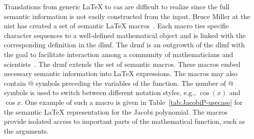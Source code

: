 \documentclass[a4paper,11pt]{article}
\theoremstyle{defTheoStyle}
\theoremstyle{defExampStyle}
\begin{document}
	Translations from generic \LaTeX{} to \gls*{cas} are difficult to realize since the full semantic information is not easily constructed from the input. Bruce Miller at the \gls*{nist} has created a set of semantic \LaTeX{} macros~\parencite{DLMF:Macros}. Each macro ties specific character sequences to a well-defined mathematical object and is linked with the corresponding definition in the \gls*{dlmf}. The \gls*{drmf} is an outgrowth of the \gls*{dlmf} with the goal to facilitate interaction among a community of mathematicians and scientists~\parencites{DRMF:14}{DRMF:15}. The \gls*{drmf} extends the set of semantic macros. These macros embed necessary semantic information into \LaTeX{} expressions. The macros may also contain $@$ symbols preceding the variables of the function. The number of $@$ symbols is used to switch between different notation styles, e.g., $\cos(x)$ and $\cos x$. One example of such a macro is given in Table~\ref{tab:JacobiP-usecase} for the semantic \LaTeX{} representation for the Jacobi polynomial. The macros provide isolated access to important parts of the mathematical function, such as the arguments. 
	
\end{document}
